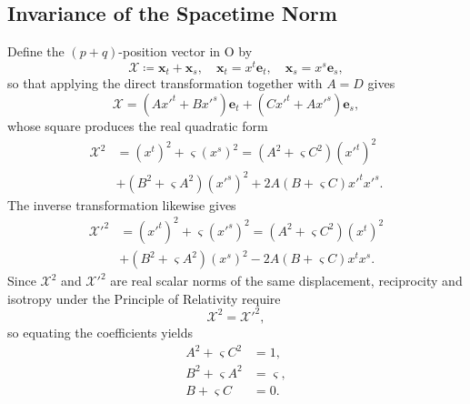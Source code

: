 \subsection{Invariance of the Spacetime Norm}
Define the $(p+q)$-position vector in $\mathrm{O}$ by
\begin{equation}\label{eq_pq_position_def}
    \boldsymbol{\mathcal{X}} \coloneqq \mathbf{x}_{t} + \mathbf{x}_{s},\quad
    \mathbf{x}_{t} = x^{t}\mathbf{e}_{t},\quad
    \mathbf{x}_{s} = x^{s}\mathbf{e}_{s},
\end{equation}
so that applying the direct transformation together with $A = D$ gives
\begin{equation}
    \boldsymbol{\mathcal{X}}
    = \left(Ax'^{t} + Bx'^{s}\right)\mathbf{e}_{t}
    + \left(Cx'^{t} + Ax'^{s}\right)\mathbf{e}_{s},
\end{equation}
whose square produces the real quadratic form
\begin{equation}\label{eq_expansion_direct}
\begin{split}
    \boldsymbol{\mathcal{X}}^{2}
    &= (x^{t})^{2} + \varsigma(x^{s})^{2}= (A^{2}+ \varsigma C^{2})(x'^{t})^{2}\\
    &+ (B^{2}+ \varsigma A^{2})(x'^{s})^{2}
    + 2A(B + \varsigma C)x'^{t}x'^{s}.
\end{split}
\end{equation}
The inverse transformation likewise gives
\begin{equation}\label{eq_expansion_inverse}
\begin{split}
    \boldsymbol{\mathcal{X}}'^{2}
    &= (x'^{t})^{2} + \varsigma(x'^{s})^{2}= (A^{2} + \varsigma C^{2})(x^{t})^{2}\\
    &+ (B^{2} + \varsigma A^{2})(x^{s})^{2}
    - 2A(B + \varsigma C)x^{t}x^{s}.
\end{split}
\end{equation}
Since $\boldsymbol{\mathcal{X}}^{2}$ and $\boldsymbol{\mathcal{X}}'^{2}$ are real scalar norms of the same displacement, reciprocity and isotropy under the Principle of Relativity require
\begin{equation}
    \boldsymbol{\mathcal{X}}^{2} = \boldsymbol{\mathcal{X}}'^{2},
\end{equation}
so equating the coefficients yields
\begin{subequations}\label{eq_scalar_invariance_constraints}
\begin{align}
    A^{2} + \varsigma C^{2} &= 1,\\
    B^{2} + \varsigma A^{2} &= \varsigma,\label{eq_scalar_invariant_for_B}\\
    B + \varsigma C &= 0.
\end{align}
\end{subequations}
